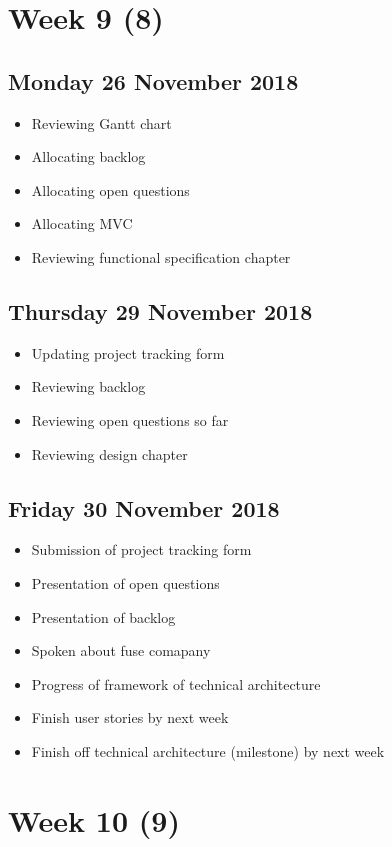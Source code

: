 \section*{Week 9 (8)}
\subsection*{Monday 26 November 2018}
\begin{itemize}
	\item Reviewing Gantt chart
	\item Allocating backlog
	\item Allocating open questions
	\item Allocating MVC
	\item Reviewing functional specification chapter
\end{itemize}

\subsection*{Thursday 29 November 2018}
\begin{itemize}
	\item Updating project tracking form
	\item Reviewing backlog
	\item Reviewing open questions so far
	\item Reviewing design chapter
\end{itemize}

\subsection*{Friday 30 November 2018}
\begin{itemize}
	\item Submission of project tracking form
	\item Presentation of open questions
	\item Presentation of backlog
	\item Spoken about fuse comapany
	\item Progress of framework of technical architecture
	\item Finish user stories by next week
	\item Finish off technical architecture (milestone) by next week
\end{itemize}

\section*{Week 10 (9)}
